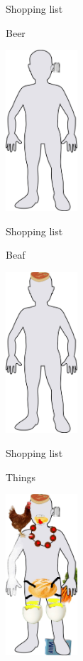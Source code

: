 \begin{frame}{Shopping list}
  \begin{block}{Beer}
    \begin{center}
      \includegraphics[height=6cm]{img/body/body-09.jpg}
    \end{center}
  \end{block}
\end{frame}

\begin{frame}{Shopping list}
  \begin{block}{Beaf}
    \begin{center}
      \includegraphics[height=6cm]{img/body/body-10.jpg}
    \end{center}
  \end{block}
\end{frame}

\begin{frame}{Shopping list}
  \begin{block}{Things}
    \begin{center}
      \includegraphics[height=6cm]{img/body/body-things.jpg}
    \end{center}
  \end{block}
\end{frame}

